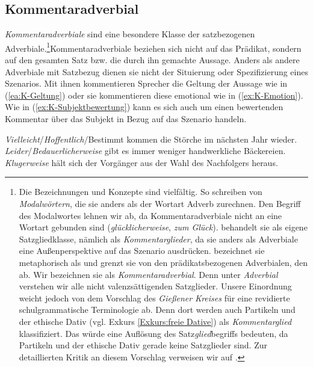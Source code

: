 \subsection{Kommentaradverbial}\label{subsubsection:Kommentaradverbial}

\textit{Kommentaradverbiale} sind eine besondere Klasse der satzbezogenen Adverbiale.\footnote{Die Bezeichnungen und Konzepte sind vielfältig. So schreiben \citet[687]{HeidolphFlaemigMotsch1981} von \textit{Modalwörtern}, die sie anders als \citet[430]{HelbigBuscha} der Wortart Adverb zurechnen. Den Begriff des Modalwortes lehnen wir ab, da Kommentaradverbiale nicht an eine Wortart gebunden sind (\textit{glücklicherweise}, \textit{zum Glück}). \citet[43]{Agel2017} behandelt sie als eigene Satzgliedklasse, nämlich als \textit{Kommentarglieder}, da sie anders als Adverbiale eine Außenperspektive auf das Szenario ausdrücken. \citet[65]{Boettcher2009EinfSatz} bezeichnet sie metaphorisch als  und grenzt sie von den prädikatsbezogenen Adverbialen, den  ab. Wir bezeichnen sie als \textit{Kommentaradverbial}. Denn unter \textit{Adverbial} verstehen wir alle nicht valenzsättigenden Satzglieder. Unsere Einordnung weicht jedoch von dem Vorschlag des \textit{Gießener Kreises} für eine revidierte schulgrammatische Terminologie ab. Denn dort werden auch Partikeln und der ethische Dativ (vgl. Exkurs \ref{Exkurs:freie Dative}) als \textit{Kommentarglied} klassifiziert. Das würde eine Auflösung des Satz\textit{glied}begriffs bedeuten, da Partikeln und der ethische Dativ gerade keine Satzglieder sind. Zur detaillierten Kritik an diesem Vorschlag verweisen wir auf \citet{Pittner2014}.}Kommentaradverbiale beziehen sich nicht auf das Prädikat, sondern auf den gesamten Satz bzw. die durch ihn gemachte Aussage. Anders als andere Adverbiale mit Satzbezug dienen sie nicht der Situierung oder Spezifizierung eines Szenarios. Mit ihnen kommentieren Sprecher die Geltung der Aussage wie in (\ref{ea:K-Geltung}) oder sie kommentieren diese emotional wie in (\ref{ex:K-Emotion}). Wie in (\ref{ex:K-Subjektbewertung}) kann es sich auch um einen bewertenden Kommentar über das Subjekt in Bezug auf das Szenario handeln. 

\ea \label{ea:Kommentaradverbial}
\ea \label{ea:K-Geltung} \textit{Vielleicht}/\textit{Hoffentlich}/{Bestimmt} kommen die Störche im nächsten Jahr wieder.
\ex \label{ex:K-Emotion} \textit{Leider}/\textit{Bedauerlicherweise} gibt es immer weniger handwerkliche Bäckereien.
\ex \label{ex:K-Subjektbewertung} \textit{Klugerweise} hält sich der Vorgänger aus der Wahl des Nachfolgers heraus.
\z 
\z 

